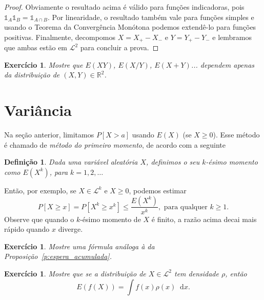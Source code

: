 \documentclass[reqno, draft]{book}
\newcommand*\1{\mathds{1}}
\newtheorem{definition}[theorem]{Definição}
\newtheorem{exercise}[example]{Exercício}
\renewcommand*\d{\mathop{}\!\mathrm{d}}
\begin{document}
\begin{proof}
  Obviamente o resultado acima é válido para funções indicadoras, pois $\1_A \1_B = \1_{A \cap B}$.
  Por linearidade, o resultado também vale para funções simples e usando o Teorema da Convergência Monótona podemos extendê-lo para funções positivas.
  Finalmente, decompomos $X = X_+ - X_-$ e $Y = Y_+ - Y_-$ e lembramos que ambas estão em $\mathcal{L}^2$ para concluir a prova.
\end{proof}

\begin{exercise}
  Mostre que $E(XY)$, $E(X/Y)$, $E(X + Y)$... dependem apenas da distribuição de $(X,Y) \in \mathbb{R}^2$.
\end{exercise}


\section{Variância}

Na seção anterior, limitamos $P[X > a]$ usando $E(X)$ (se $X \geq 0$).
Esse método é chamado de \emph{método do primeiro momento},  de acordo com a seguinte
\begin{definition}
  Dada uma variável aleatória $X$, definimos o seu $k$-ésimo momento como $E(X^k)$, para $k = 1, 2, \dots$
\end{definition}

Então, por exemplo, se $X \in \mathcal{L}^k$ e $X \geq 0$, podemos estimar
\begin{equation}
  P[X \geq x] = P [X^k \geq x^k] \leq \frac{E(X^k)}{x^k}, \text{ para qualquer $k \geq 1$.}
\end{equation}
Observe que quando o $k$-ésimo momento de $X$ é finito, a razão acima decai mais rápido quando $x$ diverge.

\begin{exercise}
  Mostre uma fórmula análoga à da Proposição~\ref{p:espera_acumulada}.
\end{exercise}

\begin{exercise}
  Mostre que se a distribuição de $X \in \mathcal{L}^2$ tem densidade $\rho$, então
  \begin{equation}
    E(f(X)) = \int f(x) \rho(x) \d x.
  \end{equation}
\end{exercise}
\end{document}
